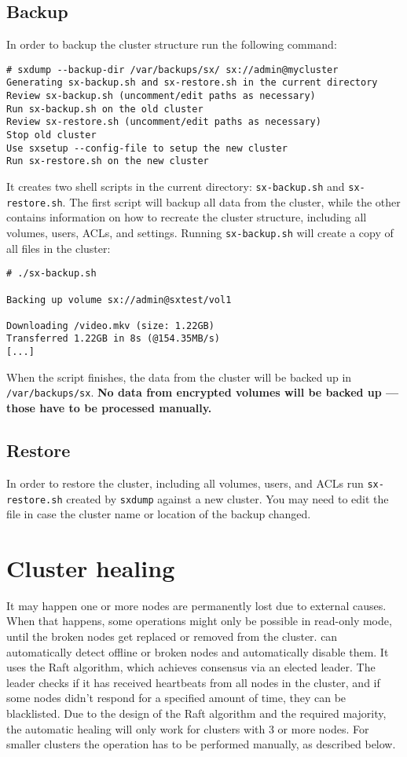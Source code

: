 \subsection{Backup}
In order to backup the cluster structure run the following command:
\begin{lstlisting}
# sxdump --backup-dir /var/backups/sx/ sx://admin@mycluster
Generating sx-backup.sh and sx-restore.sh in the current directory
Review sx-backup.sh (uncomment/edit paths as necessary)
Run sx-backup.sh on the old cluster
Review sx-restore.sh (uncomment/edit paths as necessary)
Stop old cluster
Use sxsetup --config-file to setup the new cluster
Run sx-restore.sh on the new cluster
\end{lstlisting}
It creates two shell scripts in the current directory: \verb+sx-backup.sh+ and
\verb+sx-restore.sh+. The first script will backup all data from the cluster,
while the other contains information on how to recreate the cluster structure,
including all volumes, users, ACLs, and settings. Running
\verb+sx-backup.sh+ will create a copy of all files in the cluster:
\begin{lstlisting}
# ./sx-backup.sh

Backing up volume sx://admin@sxtest/vol1

Downloading /video.mkv (size: 1.22GB)
Transferred 1.22GB in 8s (@154.35MB/s)           
[...]
\end{lstlisting}
When the script finishes, the data from the cluster will be backed up
in \verb+/var/backups/sx+. \textbf{No data from encrypted volumes will be
backed up --- those have to be processed manually.}

\subsection{Restore}
In order to restore the cluster, including all volumes, users, and ACLs run
\verb+sx-restore.sh+ created by \verb+sxdump+ against a new cluster. You may
need to edit the file in case the cluster name or location of the backup changed.

\section{Cluster healing}
It may happen one or more nodes are permanently lost due to external causes.
When that happens, some operations might only be possible in read-only mode,
until the broken nodes get replaced or removed from the cluster.
\SX can automatically detect offline or broken nodes and automatically disable
them. It uses the Raft algorithm, which achieves consensus via an elected leader.
The leader checks if it has received heartbeats from all nodes in the cluster, and
if some nodes didn't respond for a specified amount of time, they can be
blacklisted. Due to the design of the Raft algorithm and the required majority,
the automatic healing will only work for clusters with 3 or more nodes. For
smaller clusters the operation has to be performed manually, as described below.

